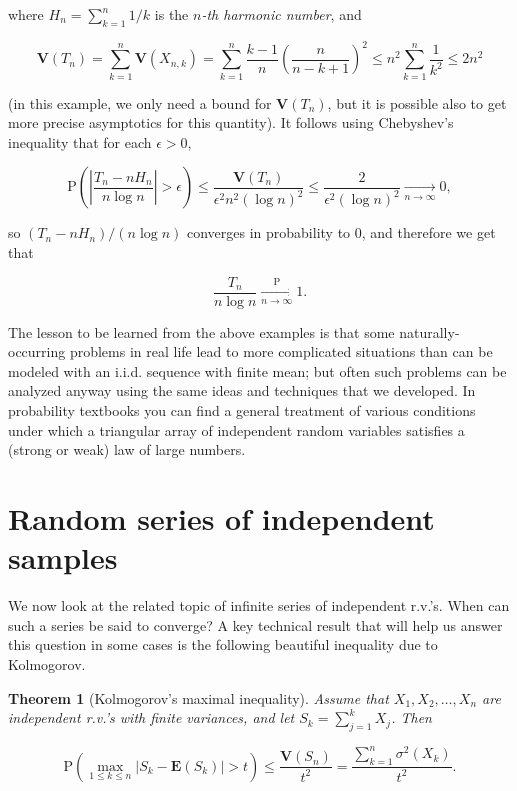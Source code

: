 \documentclass[11pt]{report}
\theoremstyle{plain}
\newtheorem{thm}{Theorem}[chapter]
\theoremstyle{definition}
\begin{document}
where $H_n = \sum_{k=1}^n 1/k$ is the \emph{$n$-th
harmonic number}, and

\[
\mathbf{V}(T_n) = \sum_{k=1}^n \mathbf{V}(X_{n,k}) =
\sum_{k=1}^n \frac{k-1}{n}\left(\frac{n}{n-k+1}\right)^2 \le n^2 \sum_{k=1}^n \frac{1}{k^2} \le 2 n^2
\]

(in this example, we only need a bound for
$\mathbf{V}(T_n)$, but it is possible also to get
more precise asymptotics for this quantity). It
follows using Chebyshev's inequality that for each
$\epsilon>0$,

\[
\mathrm{P}\left( \left|\frac{T_n-n H_n}{n \log n} \right| > \epsilon\right) \le \frac{\mathbf{V}(T_n)}{\epsilon^2 n^2 (\log n)^2}
\le \frac{2}{\epsilon^2 (\log n)^2} \xrightarrow[n\to\infty]{} 0,
\]

so $(T_n-n H_n)/(n\log n)$ converges in probability
to $0$, and therefore we get that

\[
\frac{T_n}{n\log n} \xrightarrow[n\to\infty]{\mathrm{P}} 1.
\]

The lesson to be learned from the above examples is
that some naturally-occurring problems in real life
lead to more complicated situations than can be
modeled with an i.i.d. sequence with finite mean; but
often such problems can be analyzed anyway using the
same ideas and techniques that we developed. In
probability textbooks you can find a general treatment
of various conditions under which a triangular array
of independent random variables satisfies a (strong or
weak) law of large numbers.

\section{Random series of independent samples}
We now look at the related topic of infinite series
of independent r.v.'s. When can such a series be said
to converge? A key technical result that will help us
answer this question in some cases is the following
beautiful inequality due to Kolmogorov.

\begin{thm}[Kolmogorov's maximal inequality]
Assume that $X_1,X_2,\ldots,X_n$ are independent
r.v.'s with finite variances, and let
$S_k=\sum_{j=1}^k X_j$. Then

\[
\mathrm{P}\left( \max_{1\le k\le n} |S_k-\mathbf{E} (S_k)| > t \right) \le \frac{\mathbf{V}(S_n)}{t^2} = \frac{\sum_{k=1}^n \sigma^2(X_k)}{t^2}.
\]

\end{thm}
\end{document}
